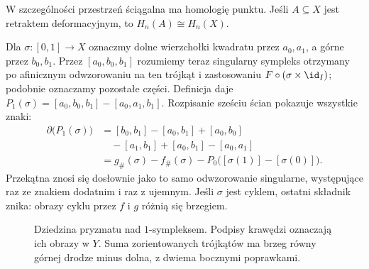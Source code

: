 W szczególności przestrzeń ściągalna
ma homologię punktu. Jeśli
$A\subseteq X$ jest retraktem
deformacyjnym, to $H_n(A)\cong H_n(X)$.

\begin{przyklad}
\label{prz:pryzmat-drogi}
Dla $\sigma:[0,1]\to X$ oznaczmy dolne wierzchołki kwadratu
przez $a_0,a_1$, a górne przez $b_0,b_1$.
Przez $[a_0,b_0,b_1]$ rozumiemy teraz singularny sympleks
otrzymany po afinicznym odwzorowaniu na ten trójkąt i zastosowaniu
$F\circ(\sigma\times\id_I)$; podobnie oznaczamy pozostałe części.
Definicja daje $P_1(\sigma)=[a_0,b_0,b_1]-[a_0,a_1,b_1]$.
Rozpisanie sześciu ścian pokazuje wszystkie znaki:
\[
 \begin{aligned}
 \partial\bigl(P_1(\sigma)\bigr)
 &=[b_0,b_1]-[a_0,b_1]+[a_0,b_0]\\
 &\quad-[a_1,b_1]+[a_0,b_1]-[a_0,a_1]\\
 &=g_\#(\sigma)-f_\#(\sigma)
   -P_0\bigl([\sigma(1)]-[\sigma(0)]\bigr).
 \end{aligned}
\]
Przekątna znosi się dosłownie jako to samo odwzorowanie
singularne, występujące raz ze znakiem dodatnim i raz z ujemnym.
Jeśli $\sigma$ jest cyklem, ostatni składnik znika: obrazy
cyklu przez $f$ i $g$ różnią się brzegiem.
\end{przyklad}

\begin{figure}[!htbp]
\centering
{}
\caption{Dziedzina pryzmatu nad $1$-sympleksem. Podpisy krawędzi
oznaczają ich obrazy w $Y$. Suma zorientowanych trójkątów ma brzeg
równy górnej drodze minus dolna, z dwiema bocznymi poprawkami.}
\label{fig:pryzmat-homologia}
\end{figure}

